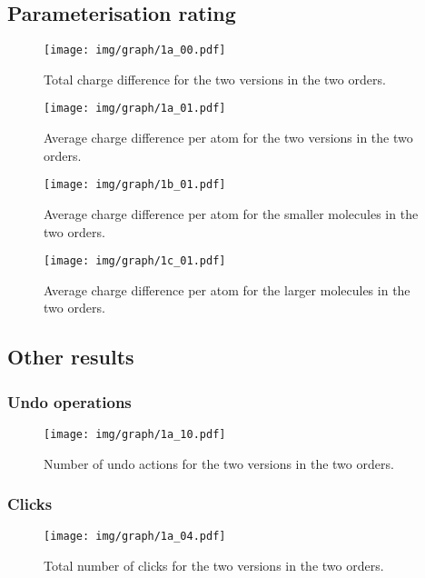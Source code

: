 \subsection{Parameterisation rating}
\nlipsum

\begin{figure}
\center
\texttt{[image: img/graph/1a\_00.pdf]}
\caption{Total charge difference for the two versions in the two orders.}
\end{figure}

\begin{figure}
\center
\texttt{[image: img/graph/1a\_01.pdf]}
\caption{Average charge difference per atom for the two versions in the two orders.}
\end{figure}

\begin{figure}
\center
\texttt{[image: img/graph/1b\_01.pdf]}
\caption{Average charge difference per atom for the smaller molecules in the two orders.}
\end{figure}

\begin{figure}
\center
\texttt{[image: img/graph/1c\_01.pdf]}
\caption{Average charge difference per atom for the larger molecules in the two orders.}
\end{figure}

\subsection{Other results}
\nlipsum

\subsubsection{Undo operations}
\nlipsum

\begin{figure}
\center
\texttt{[image: img/graph/1a\_10.pdf]}
\caption{Number of undo actions for the two versions in the two orders.}
\end{figure}

\subsubsection{Clicks}
\nlipsum

\begin{figure}
\center
\texttt{[image: img/graph/1a\_04.pdf]}
\caption{Total number of clicks for the two versions in the two orders.}
\end{figure}

